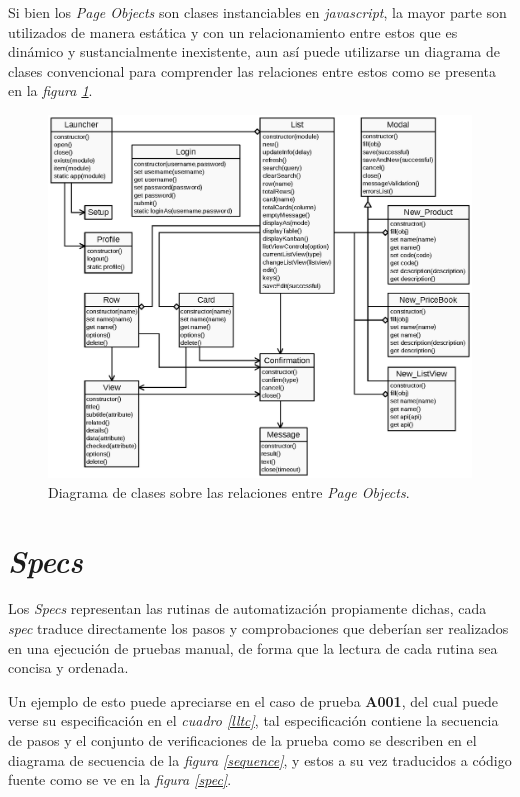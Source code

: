 Si bien los \emph{Page Objects} son clases instanciables en \emph{javascript},
la mayor parte son utilizados de manera estática y con un relacionamiento
entre estos que es dinámico y sustancialmente inexistente, aun así puede
utilizarse un diagrama de clases convencional para comprender las relaciones
entre estos como se presenta en la \emph{figura \ref{pom}}.

\begin{figure}
\centering
\includegraphics[width=1.0\textwidth]{graphics/diagram01.eps}
\caption{Diagrama de clases sobre las relaciones entre \emph{Page Objects}.}
\label{pom}
\end{figure}

\section{\emph{Specs}}
Los \emph{Specs} representan las rutinas de automatización propiamente dichas,
cada \emph{spec} traduce directamente los pasos y comprobaciones que deberían
ser realizados en una ejecución de pruebas manual, de forma que la lectura de
cada rutina sea concisa y ordenada.

Un ejemplo de esto puede apreciarse en el caso de prueba \textbf{A001}, del cual
puede verse su especificación en el \emph{cuadro \ref{lltc}}, tal especificación
contiene la secuencia de pasos y el conjunto de verificaciones de la prueba como
se describen en el diagrama de secuencia de la \emph{figura \ref{sequence}}, y
estos a su vez traducidos a código fuente como se ve en la
\emph{figura \ref{spec}}.

